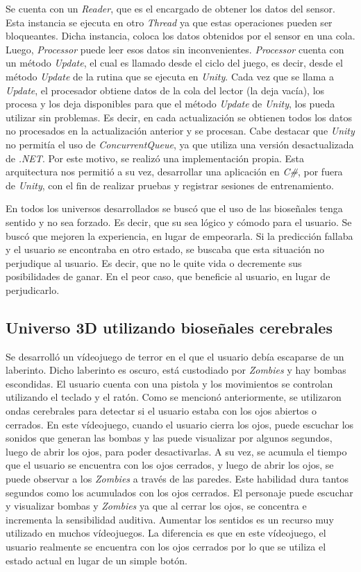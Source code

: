 Se cuenta con un \emph{Reader}, que es el encargado de obtener los datos del sensor. Esta instancia se ejecuta en otro \emph{Thread} ya que estas operaciones pueden ser bloqueantes. Dicha instancia, coloca los datos obtenidos por el sensor en una cola. Luego, \emph{Processor} puede leer esos datos sin inconvenientes. \emph{Processor} cuenta con un método \emph{Update}, el cual es llamado desde el ciclo del juego, es decir, desde el método \emph{Update} de la rutina que se ejecuta en \emph{Unity}. Cada vez que se llama a \emph{Update}, el procesador obtiene datos de la cola del lector (la deja vacía), los procesa y los deja disponibles para que el método \emph{Update} de \emph{Unity}, los pueda utilizar sin problemas. Es decir, en cada actualización se obtienen todos los datos no procesados en la actualización anterior y se procesan. Cabe destacar que \emph{Unity} no permitía el uso de \emph{ConcurrentQueue}, ya que utiliza una versión desactualizada de \emph{.NET}. Por este motivo, se realizó una implementación propia. Esta arquitectura nos permitió a su vez, desarrollar una aplicación en \emph{C\#}, por fuera de \emph{Unity}, con el fin de realizar pruebas y registrar sesiones de entrenamiento.

En todos los universos desarrollados se buscó que el uso de las bioseñales tenga sentido y no sea forzado. Es decir, que su sea lógico y cómodo para el usuario. Se buscó que mejoren la experiencia, en lugar de empeorarla. Si la predicción fallaba y el usuario se encontraba en otro estado, se buscaba que esta situación no perjudique al usuario. Es decir, que no le quite vida o decremente sus posibilidades de ganar. En el peor caso, que beneficie al usuario, en lugar de perjudicarlo.

\subsection{Universo 3D utilizando bioseñales cerebrales}

Se desarrolló un vídeojuego de terror en el que el usuario debía escaparse de un laberinto. Dicho laberinto es oscuro, está custodiado por \emph{Zombies} y hay bombas escondidas. El usuario cuenta con una pistola y los movimientos se controlan utilizando el teclado y el ratón. Como se mencionó anteriormente, se utilizaron ondas cerebrales para detectar si el usuario estaba con los ojos abiertos o cerrados. En este vídeojuego, cuando el usuario cierra los ojos, puede escuchar los sonidos que generan las bombas y las puede visualizar por algunos segundos, luego de abrir los ojos, para poder desactivarlas. A su vez, se acumula el tiempo que el usuario se encuentra con los ojos cerrados, y luego de abrir los ojos, se puede observar a los \emph{Zombies} a través de las paredes. Este habilidad dura tantos segundos como los acumulados con los ojos cerrados. El personaje puede escuchar y visualizar bombas y \emph{Zombies} ya que al cerrar los ojos, se concentra e incrementa la sensibilidad auditiva. Aumentar los sentidos es un recurso muy utilizado en muchos vídeojuegos. La diferencia es que en este vídeojuego, el usuario realmente se encuentra con los ojos cerrados por lo que se utiliza el estado actual en lugar de un simple botón.

